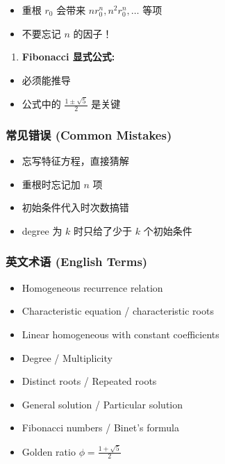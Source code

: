 \documentclass[10pt,a4paper,openany]{ctexbook}
\theoremstyle{definition}
\theoremstyle{remark}
\begin{document}
\begin{itemize}
\item 重根 $r_0$ 会带来 $n r_0^n, n^2 r_0^n, \dots$ 等项
\item 不要忘记 $n$ 的因子！

\end{itemize}

\begin{enumerate}
\item \textbf{Fibonacci 显式公式:}
\end{enumerate}

\begin{itemize}
\item 必须能推导
\item 公式中的 $\frac{1\pm\sqrt{5}}{2}$ 是关键

\end{itemize}

\subsubsection{常见错误 (Common Mistakes)}

\begin{itemize}
\item 忘写特征方程，直接猜解
\item 重根时忘记加 $n$ 项
\item 初始条件代入时次数搞错
\item degree 为 $k$ 时只给了少于 $k$ 个初始条件

\end{itemize}

\subsubsection{英文术语 (English Terms)}

\begin{itemize}
\item Homogeneous recurrence relation
\item Characteristic equation / characteristic roots
\item Linear homogeneous with constant coefficients
\item Degree / Multiplicity
\item Distinct roots / Repeated roots
\item General solution / Particular solution
\item Fibonacci numbers / Binet's formula
\item Golden ratio $\phi = \frac{1+\sqrt{5}}{2}$

\end{itemize}
\end{document}
